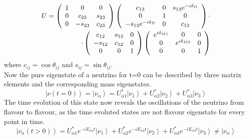     \begin{equation}
	\centering
	\begin{split}
     U = \left(
	\begin{array}{ccc}
      	1 & 0 & 0\\
      	0 & c_{23} & s_{23}\\
      	0 & -s_{23} & c_{23}\\
   	\end{array}
	\right)
	\left(
	\begin{array}{ccc}
      	c_{13} & 0 & s_{13}e^{-i\delta_D}\\
      	0 & 1 & 0\\
      	-s_{13}e^{-i\delta_D} & 0 & c_{13}\\
      	\end{array}
	\right)\cdot\\
	\cdot\left(
	\begin{array}{ccc}
      	c_{12} & s_{12} & 0\\
      	-s_{12} & c_{12} & 0\\
      	0 & 0 & 1\\
      	\end{array}
	\right)
		\left(
	\begin{array}{ccc}
      	e^{i\delta_{M1}} & 0 & 0\\
      	0 & e^{i\delta_{M2}} & 0\\
      	0 & 0 & 1\\
      	\end{array}
	\right)
	\end{split}
    \end{equation}
    where $c_{ij}=\cos{\theta_{ij}}$ and $s_{ij}=\sin{\theta_{ij}}$.\\
	Now the pure eigenstate of a neutrino for t=0 can be described by three matrix elements and the corresponding mass eigenstates.
	\begin{equation}
		\left|\nu(t=0)\right> = \left|\nu_\alpha\right> = U^*_{\alpha1} \left|\nu_1\right> + U^*_{\alpha2} \left|\nu_2\right> + U^*_{\alpha3} \left|\nu_3\right> 
	\end{equation}
	The time evolution of this state now reveals the oscillations of the neutrino from flavour to flavour, as the time evoluted states are not flavour eigenstate for every point in time.
	\begin{equation}
		\left|\nu_\alpha(t>0)\right> = U^*_{\alpha1} e^{-iE_{\alpha1}t}\left|\nu_1\right> + U^*_{\alpha2} e^{-iE_{\alpha2}t}\left|\nu_2\right> + U^*_{\alpha3}e^{-iE_{\alpha3}t} \left|\nu_3\right> \neq \left|\nu_\alpha\right> 
	\end{equation}
	

